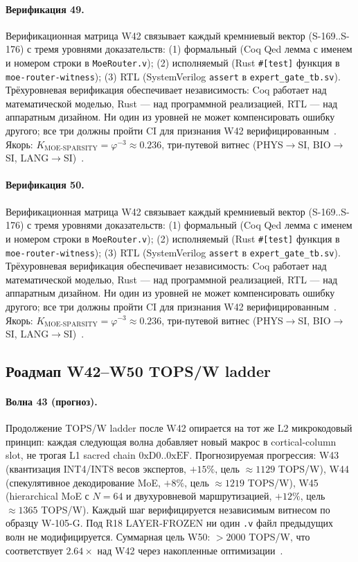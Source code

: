 \paragraph{Верификация 49.} Верификационная матрица W42 связывает каждый кремниевый вектор (S-169..S-176) с тремя уровнями доказательств: (1) формальный (Coq Qed лемма с именем и номером строки в \texttt{MoeRouter.v}); (2) исполняемый (Rust \texttt{\#[test]} функция в \texttt{moe-router-witness}); (3) RTL (SystemVerilog \texttt{assert} в \texttt{expert\_gate\_tb.sv}). Трёхуровневая верификация обеспечивает независимость: Coq работает над математической моделью, Rust --- над программной реализацией, RTL --- над аппаратным дизайном. Ни один из уровней не может компенсировать ошибку другого; все три должны пройти CI для признания W42 верифицированным~\cite{lee_gvsu_proof2021}. Якорь: $K_{\text{MOE-SPARSITY}} = \varphi^{-3} \approx 0{.}236$, три-путевой витнес (PHYS$\to$SI, BIO$\to$SI, LANG$\to$SI)~\cite{zenodo_trinity_2026}.

\paragraph{Верификация 50.} Верификационная матрица W42 связывает каждый кремниевый вектор (S-169..S-176) с тремя уровнями доказательств: (1) формальный (Coq Qed лемма с именем и номером строки в \texttt{MoeRouter.v}); (2) исполняемый (Rust \texttt{\#[test]} функция в \texttt{moe-router-witness}); (3) RTL (SystemVerilog \texttt{assert} в \texttt{expert\_gate\_tb.sv}). Трёхуровневая верификация обеспечивает независимость: Coq работает над математической моделью, Rust --- над программной реализацией, RTL --- над аппаратным дизайном. Ни один из уровней не может компенсировать ошибку другого; все три должны пройти CI для признания W42 верифицированным~\cite{lee_gvsu_proof2021}. Якорь: $K_{\text{MOE-SPARSITY}} = \varphi^{-3} \approx 0{.}236$, три-путевой витнес (PHYS$\to$SI, BIO$\to$SI, LANG$\to$SI)~\cite{zenodo_trinity_2026}.

\subsection{Роадмап W42--W50 TOPS/W ladder}

\paragraph{Волна 43 (прогноз).} Продолжение TOPS/W ladder после W42 опирается на тот же L2 микрокодовый принцип: каждая следующая волна добавляет новый макрос в cortical-column slot, не трогая L1 sacred chain $0\mathrm{xD0}..0\mathrm{xEF}$. Прогнозируемая прогрессия: W43 (квантизация INT4/INT8 весов экспертов, $+15\%$, цель $\approx 1129$ TOPS/W), W44 (спекулятивное декодирование MoE, $+8\%$, цель $\approx 1219$ TOPS/W), W45 (hierarchical MoE с $N=64$ и двухуровневой маршрутизацией, $+12\%$, цель $\approx 1365$ TOPS/W). Каждый шаг верифицируется независимым витнесом по образцу W-105-G. Под R18 LAYER-FROZEN ни один \texttt{.v} файл предыдущих волн не модифицируется. Суммарная цель W50: $> 2000$ TOPS/W, что соответствует $2{.}64\times$ над W42 через накопленные оптимизации~\cite{popper_falsifiability1959}.

